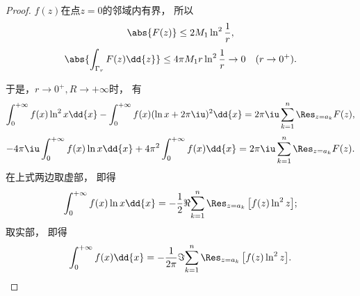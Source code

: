 \begin{theorem}
\begin{proof}
\(f(z)\)在点\(z=0\)的邻域内有界，
所以\begin{equation*}
	\abs{F(z)} \leq 2M_1 \ln^2 \frac{1}{r},
\end{equation*}\begin{equation*}
	\abs{\int_{\Gamma_r} F(z) \dd{z}}
	\leq 4\pi M_1 r \ln^2 \frac{1}{r}
	\to 0 \quad(r\to0^+).
\end{equation*}

于是，\(r\to0^+, R\to+\infty\)时，
有\begin{equation*}
	\int_0^{+\infty} f(x) \ln^2 x \dd{x}
	- \int_0^{+\infty} f(x) (\ln x + 2\pi\iu)^2 \dd{x}
	= 2\pi\iu \sum_{k=1}^n \Res_{z=a_k} F(z),
\end{equation*}\begin{equation*}
	-4\pi\iu \int_0^{+\infty} f(x) \ln x \dd{x}
	+ 4\pi^2 \int_0^{+\infty} f(x) \dd{x}
	= 2\pi\iu \sum_{k=1}^n \Res_{z=a_k} F(z).
\end{equation*}
在上式两边取虚部，
即得\begin{equation}\label{equation:留数定理.利用留数定理计算实积分4.2}
	\int_0^{+\infty} f(x) \ln x \dd{x}
	= -\frac{1}{2} \Re{ \sum_{k=1}^n \Res_{z=a_k} \left[ f(z) \ln^2 z \right] };
\end{equation}
取实部，
即得\begin{equation}\label{equation:留数定理.利用留数定理计算实积分4.3}
	\int_0^{+\infty} f(x) \dd{x}
	= -\frac{1}{2\pi} \Im{ \sum_{k=1}^n \Res_{z=a_k} \left[ f(z) \ln^2 z \right] }.
\end{equation}
\end{proof}
\end{theorem}

